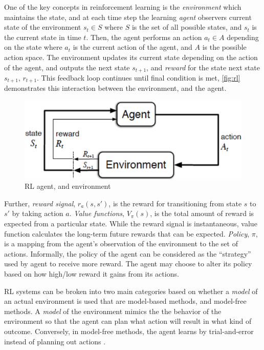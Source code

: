 \documentclass[a4paper, 12pt, conference]{IEEEtran}
\begin{document}
One of the key concepts in reinforcement learning is the \emph{environment} which maintains the state, and at each time step the learning \emph{agent} observers current state of the environment \(s_t \in S\) where \(S\) is the set of all possible states, and \(s_t\) is the current state in time \(t\). Then, the agent performs an action \(a_t \in A\) depending on the state where \(a_t\) is the current action of the agent, and \(A\) is the possible action space. The environment updates its current state depending on the action of the agent, and outputs the next state \(s_{t+1}\), and \emph{reward} for the state next state \(s_{t+1}\), \(r_{t+1}\). This feedback loop continues until final condition is met, \autoref{fig:rl} demonstrates this interaction between the environment, and the agent.
\begin{figure}
    \centering
    \includegraphics[width=\linewidth]{img/rl.png}
    \caption{RL agent, and environment \cite{sutton2018reinforcement}}
    \label{fig:rl}
\end{figure}

Further, \emph{reward signal}, \(r_a(s,s')\), is the reward for transitioning from state \(s\) to \(s'\) by taking action \(a\). \emph{Value functions}, \(V_{\pi}(s)\), is the total amount of reward is expected from a particular state. While the reward signal is instantaneous, value function calculates the long-term future rewards that can be expected. \emph{Policy}, \(\pi\), is a mapping from the agent's observation of the environment to the set of actions. Informally, the policy of the agent can be considered as the ``strategy'' used by agent to receive more reward. The agent may choose to alter its policy based on how high/low reward it gains from its actions.

RL systems can be broken into two main categories based on whether a \emph{model} of an actual environment is used that are model-based methods, and model-free methods. A \emph{model} of the environment mimics the the behavior of the environment so that the agent can plan what action will result in what kind of outcome. Conversely, in model-free methods, the agent learns by trial-and-error instead of planning out actions \cite{sutton2018reinforcement}.
\end{document}
